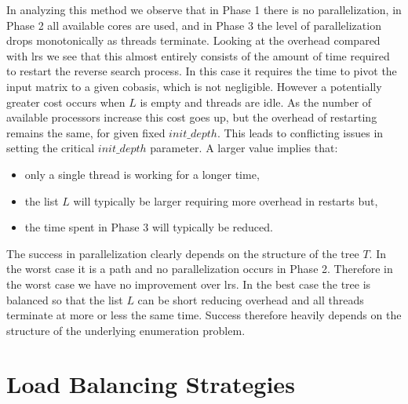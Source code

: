 \documentclass[a4paper,11pt]{article}   \usepackage{authblk} \usepackage[top=1.9cm,bottom=1.9cm,left=1.9cm,right=1.9cm]{geometry}
\newcommand{\progname}{\textsf}
\newcommand{\lrs}{\progname{lrs}\xspace}
\newcommand{\initdepth}{\ensuremath{\mathit{init\_depth}}\xspace}
\begin{document}
In analyzing this method we observe that in Phase 1 there is 
no parallelization, in Phase 2 all available cores are used, and in Phase 3
the level of parallelization drops monotonically as threads terminate.
Looking at the overhead compared with \lrs we see that
this almost entirely consists of the amount of 
time required to restart the reverse
search process. In this case it requires the time to pivot the input matrix to a given 
cobasis, which is not negligible.
However a potentially greater cost occurs when $L$ is empty and threads are idle.
As the number of available processors increase this cost goes up, but the overhead of restarting
remains the same, for given fixed \initdepth.
This leads to conflicting issues in setting the 
critical \initdepth parameter. A larger value implies that: 
\begin{itemize}
\item
only a single thread is working for a longer
time,
\item
the list $L$ will typically be larger requiring more overhead in restarts but,
\item
the time spent in Phase 3 will typically be reduced.
\end{itemize}

The success in parallelization clearly depends on the structure of the tree $T$.
In the worst case it is a path and no parallelization occurs in Phase 2.
Therefore in the worst case we have no improvement  
over \lrs.
In the best case the tree is balanced so that the list $L$ can be
short reducing overhead and all threads terminate at more or less the same time.
Success therefore heavily depends on the structure of the underlying enumeration
problem.  

\section{Load Balancing Strategies}
\end{document}
